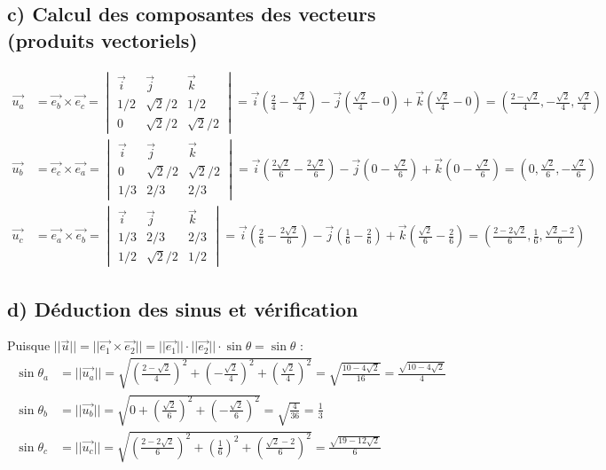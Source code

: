 \documentclass[11pt,a4paper]{article}
\begin{document}
\subsection*{c) Calcul des composantes des vecteurs (produits vectoriels)}
\begin{align*}
\vec{u_a} &= \vec{e_b} \times \vec{e_c} = 
\begin{vmatrix} 
\vec{i} & \vec{j} & \vec{k} \\ 
1/2 & \sqrt{2}/2 & 1/2 \\ 
0 & \sqrt{2}/2 & \sqrt{2}/2 
\end{vmatrix} 
= \vec{i}\left(\frac{2}{4} - \frac{\sqrt{2}}{4}\right) - \vec{j}\left(\frac{\sqrt{2}}{4} - 0\right) + \vec{k}\left(\frac{\sqrt{2}}{4} - 0\right) = \left( \frac{2-\sqrt{2}}{4}, -\frac{\sqrt{2}}{4}, \frac{\sqrt{2}}{4} \right) \\
\vec{u_b} &= \vec{e_c} \times \vec{e_a} = 
\begin{vmatrix} 
\vec{i} & \vec{j} & \vec{k} \\ 
0 & \sqrt{2}/2 & \sqrt{2}/2 \\ 
1/3 & 2/3 & 2/3 
\end{vmatrix} 
= \vec{i}\left(\frac{2\sqrt{2}}{6} - \frac{2\sqrt{2}}{6}\right) - \vec{j}\left(0 - \frac{\sqrt{2}}{6}\right) + \vec{k}\left(0 - \frac{\sqrt{2}}{6}\right) = \left( 0, \frac{\sqrt{2}}{6}, -\frac{\sqrt{2}}{6} \right) \\
\vec{u_c} &= \vec{e_a} \times \vec{e_b} = 
\begin{vmatrix} 
\vec{i} & \vec{j} & \vec{k} \\ 
1/3 & 2/3 & 2/3 \\ 
1/2 & \sqrt{2}/2 & 1/2 
\end{vmatrix} 
= \vec{i}\left(\frac{2}{6} - \frac{2\sqrt{2}}{6}\right) - \vec{j}\left(\frac{1}{6} - \frac{2}{6}\right) + \vec{k}\left(\frac{\sqrt{2}}{6} - \frac{2}{6}\right) = \left( \frac{2-2\sqrt{2}}{6}, \frac{1}{6}, \frac{\sqrt{2}-2}{6} \right)
\end{align*}

\subsection*{d) Déduction des sinus et vérification}
Puisque $||\vec{u}|| = ||\vec{e_1} \times \vec{e_2}|| = ||\vec{e_1}|| \cdot ||\vec{e_2}|| \cdot \sin\theta = \sin\theta$ :
\begin{align*}
\sin\theta_a &= ||\vec{u_a}|| = \sqrt{\left(\frac{2-\sqrt{2}}{4}\right)^2 + \left(-\frac{\sqrt{2}}{4}\right)^2 + \left(\frac{\sqrt{2}}{4}\right)^2} = \sqrt{\frac{10-4\sqrt{2}}{16}} = \frac{\sqrt{10-4\sqrt{2}}}{4} \\
\sin\theta_b &= ||\vec{u_b}|| = \sqrt{0 + \left(\frac{\sqrt{2}}{6}\right)^2 + \left(-\frac{\sqrt{2}}{6}\right)^2} = \sqrt{\frac{4}{36}} = \frac{1}{3} \\
\sin\theta_c &= ||\vec{u_c}|| = \sqrt{\left(\frac{2-2\sqrt{2}}{6}\right)^2 + \left(\frac{1}{6}\right)^2 + \left(\frac{\sqrt{2}-2}{6}\right)^2} = \frac{\sqrt{19-12\sqrt{2}}}{6}
\end{align*}
\end{document}
